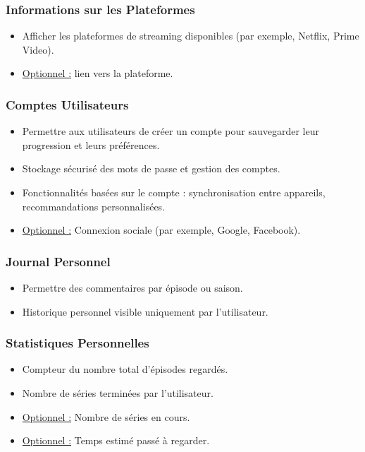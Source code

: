 \subsubsection{Informations sur les Plateformes}
\begin{itemize}
    \item Afficher les plateformes de streaming disponibles (par exemple, Netflix, Prime Video).
    \item \underline{Optionnel :} lien vers la plateforme.
\end{itemize}

\subsubsection{Comptes Utilisateurs}
\begin{itemize}
    \item Permettre aux utilisateurs de créer un compte pour sauvegarder leur progression et leurs préférences.
    \item Stockage sécurisé des mots de passe et gestion des comptes.
    \item Fonctionnalités basées sur le compte : synchronisation entre appareils, recommandations personnalisées.
    \item \underline{Optionnel :} Connexion sociale (par exemple, Google, Facebook).
\end{itemize}

\subsubsection{Journal Personnel}
\begin{itemize}
    \item Permettre des commentaires par épisode ou saison.
    \item Historique personnel visible uniquement par l'utilisateur.
\end{itemize}

\subsubsection{Statistiques Personnelles}
\begin{itemize}
    \item Compteur du nombre total d'épisodes regardés.
    \item Nombre de séries terminées par l'utilisateur.
    \item \underline{Optionnel :} Nombre de séries en cours.
    \item \underline{Optionnel :} Temps estimé passé à regarder.
\end{itemize}

